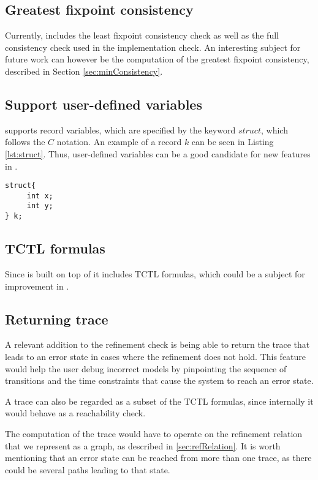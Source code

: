 \subsection{Greatest fixpoint consistency}
Currently, \jecdar includes the least fixpoint consistency check as well as the full consistency check used in the implementation check. An interesting subject for future work can however be the computation of the greatest fixpoint consistency, described in Section \ref{sec:minConsistency}.

\subsection{Support user-defined variables}
 supports record variables, which are specified by the keyword $struct$, which follows the $C$ notation. An example of a record $k$ can be seen in Listing \ref{lst:struct}. Thus, user-defined variables can be a good candidate for new features in \jecdar.
\begin{lstlisting}[caption={Record example},label={lst:struct}, captionpos=b]
struct{
     int x;
     int y;
} k;         
\end{lstlisting}

\subsection{TCTL formulas}
Since  is built on top of \uppaal it includes TCTL formulas, which could be a subject for improvement in \jecdar.

\subsection{Returning trace}
A relevant addition to the refinement check is being able to return the trace that leads to an error state in cases where the refinement does not hold. This feature would help the user debug incorrect models by pinpointing the sequence of transitions and the time constraints that cause the system to reach an error state.

A trace can also be regarded as a subset of the TCTL formulas, since internally it would behave as a reachability check.

The computation of the trace would have to operate on the refinement relation that we represent as a graph, as described in \ref{sec:refRelation}. It is worth mentioning that an error state can be reached from more than one trace, as there could be several paths leading to that state.

